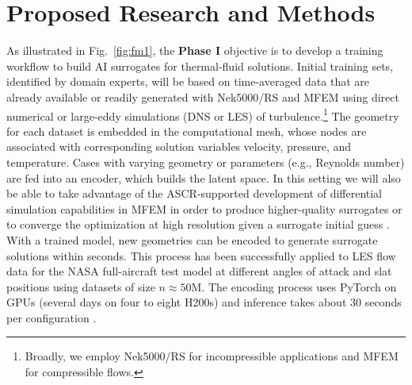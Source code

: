 \vspace*{.1in}
\section{Proposed Research and Methods}



As illustrated in Fig.~\ref{fig:fm1}, the {\bf Phase I} objective is to develop a
training workflow to build AI surrogates for thermal-fluid solutions.  
Initial training sets, identified by domain experts, will be based on time-averaged
data that are already available or readily generated with Nek5000/RS and MFEM
using direct numerical or large-eddy simulations (DNS or LES) of 
turbulence.\footnote{Broadly, 
we employ Nek5000/RS for incompressible applications
and MFEM for compressible flows.}
The geometry for each dataset is embedded in the computational mesh, whose
nodes are associated with corresponding solution variables velocity, pressure,
and temperature.   Cases with varying geometry or parameters (e.g., Reynolds
number) are fed into an encoder, which builds the latent space. In this setting
we will also be able to take advantage of the ASCR-supported development of
differential simulation capabilities in MFEM in order to produce higher-quality
surrogates or to converge the optimization at high resolution given a surrogate
initial guess \cite{MFEM24, DMC24, Schmidt26}.    With a trained model, new
geometries can be encoded to generate surrogate solutions within seconds.  
This process has been successfully applied to LES flow data for the NASA
full-aircraft test model at different angles of attack and slat positions using
datasets of size $n \approx 50$M.  The encoding process uses PyTorch on GPUs
(several days on four to eight H200s) and inference takes about 30 seconds
per configuration \cite{ricardo26b}.

